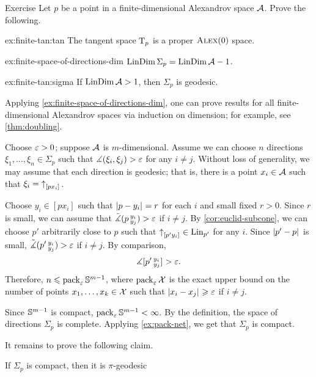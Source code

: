 \begin{thm}{Exercise}\label{ex:finite-tan}
Let $p$ be a point in a finite-dimensional Alexandrov space $\mathcal{A}$.
Prove the following.
\begin{subthm}{ex:finite-tan:tan}
The tangent space $\mathrm{T}_p$ is a proper $\textsc{Alex}(0)$ space.
\end{subthm}

\begin{subthm}{ex:finite-space-of-directions-dim}
$\mathop{\rm LinDim}\nolimits\Sigma_p=\mathop{\rm LinDim}\nolimits\mathcal{A}-1$.
\end{subthm}

\begin{subthm}{ex:finite-tan:sigma}
If $\mathop{\rm LinDim}\nolimits \mathcal{A}>1$, then $\Sigma_p$ is geodesic.
\end{subthm}

\end{thm}

Applying \ref{ex:finite-space-of-directions-dim}, one can prove results for all finite-dimensional Alexandrov spaces via induction on  dimension; for example, see \ref{thm:doubling}.

Choose $\varepsilon>0$; suppose $\mathcal{A}$ is $m$-dimensional.
Assume we can choose $n$ directions $\xi_1,\dots, \xi_n\in \Sigma_p$ such that $\measuredangle(\xi_i,\xi_j)>\varepsilon$ for any $i\ne j$.
Without loss of generality, we may assume that each direction is geodesic;
that is, there is a point $x_i\in \mathcal{A}$ such that $\xi_i={\uparrow}_{[{p}{x_i}]_{{}}}$.

Choose $y_i\in [px_i]$ such that $|{p}-{y_i}|_{}^{{}}=r$ for each $i$ and small fixed $r>0$.
Since $r$ is small, we can assume that $\tilde\measuredangle(p\,{}^{y_i}_{y_j})>\varepsilon$ if $i\ne j$.
By \ref{cor:euclid-subcone}, we can choose $p'$ arbitrarily close to $p$ such that ${\uparrow}_{[{p'}{y_i}]_{{}}}\in \mathop{\rm Lin}\nolimits_{p'}$ for any $i$.
Since  $|{p'}-{p}|_{}^{{}}$ is small, $\tilde\measuredangle(p'\,{}^{y_i}_{y_j})>\varepsilon$ if $i\ne j$.
By comparison, 
\[\measuredangle [p'\,{}^{y_i}_{y_j}]>\varepsilon.\]
Therefore, $n\leqslant \operatorname{\rm pack}\nolimits_\varepsilon\mathbb{S}^{m-1}$,
where $\operatorname{\rm pack}\nolimits_\varepsilon\mathcal{X}$ is the exact upper bound on the number of points $x_1,\dots,x_k\in \mathcal{X}$ such that $|{x_i}-{x_j}|_{}^{{}}\geqslant\varepsilon$ if $i\ne j$.

Since $\mathbb{S}^{m-1}$ is compact, $\operatorname{\rm pack}\nolimits_\varepsilon\mathbb{S}^{m-1}<\infty$.
By the definition, the space of directions $\Sigma_p$ is complete. 
Applying \ref{ex:pack-net}, we get that  $\Sigma_p$ is compact.

It remains to prove the following claim.

\begin{clm}{}
If $\Sigma_p$ is compact, then it is $\pi$-geodesic
\end{clm}

